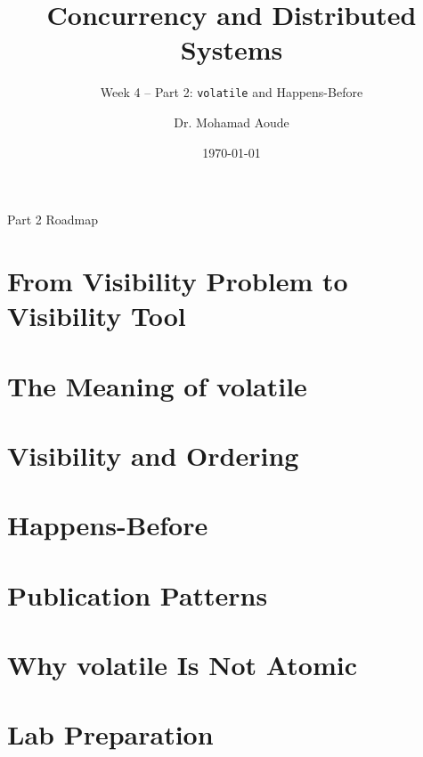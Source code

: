 \documentclass[aspectratio=169,11pt]{beamer}
\title[Week 4 -- Part 2]{Concurrency and Distributed Systems}
\subtitle{Week 4 -- Part 2: \texttt{volatile} and Happens-Before}
\author{Dr. Mohamad Aoude}
\institute{Faculty of Engineering}
\date{\today}
\begin{document}
	
	\begin{frame}
		\titlepage
	\end{frame}
	
	\begin{frame}{Part 2 Roadmap}
		\tableofcontents
	\end{frame}
	
	\section{From Visibility Problem to Visibility Tool}
	\section{The Meaning of volatile}
	\section{Visibility and Ordering}
	\section{Happens-Before}
	\section{Publication Patterns}
	\section{Why volatile Is Not Atomic}
	\section{Lab Preparation}
	
\end{document}
